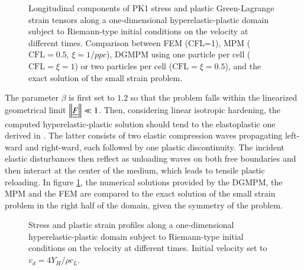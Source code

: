 \begin{figure}[h!]
  \centering
  {}
  {}
  {}
  
  \caption{Longitudinal components of PK1 stress and plastic Green-Lagrange strain tensors along a one-dimensional hyperelastic-plastic domain subject to Riemann-type initial conditions on the velocity at different times. Comparison between FEM (CFL=1), MPM ($\text{CFL}=0.5$, $\xi=1/ppc$), DGMPM using one particle per cell ($\text{CFL}=\xi=1$) or two particles per cell ($\text{CFL}=\xi=0.5$), and the exact solution of the small strain problem.}
  \label{fig:hep_planeWave}
\end{figure}
The parameter $\beta$ is first set to $1.2$ so that the problem falls within the linearized geometrical limit $\left\Vert{\underline{\underline{F}}}\right\Vert \ll 1$.
Then, considering linear isotropic hardening, the computed hyperelastic-plastic solution should tend to the elastoplastic one derived in \cite{Thomas_EP}.
The latter consists of two elastic compression waves propagating left-ward and right-ward, each followed by one plastic discontinuity.
The incident elastic disturbances then reflect as unloading waves on both free boundaries and then interact at the center of the medium, which leads to tensile plastic reloading.
In figure \ref{fig:hep_planeWave}, the numerical solutions provided by the DGMPM, the MPM and the FEM are compared to the exact solution of the small strain problem in the right half of the domain, given the symmetry of the problem.
\begin{figure}[h!]
  \centering
  {}
  {}
  {}
  {}
  {}
  {}
  {}
  {}
  {}
  
  
  
  \caption{Stress and plastic strain profiles along a one-dimensional hyperelastic-plastic domain subject to Riemann-type initial conditions on the velocity at different times. Initial velocity set to $v_d=4Y_H/\rho c_L$.
  }
  \label{fig:hep_planeWave_high}
\end{figure}

